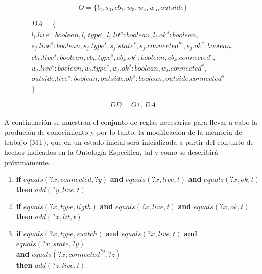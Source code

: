 \documentclass[10pt, a4paper,spanish]{article}
\begin{document}
			\begin{equation*}
				O = \{l_2, s_3, cb_1, w_3,w_4, w_5, outside\}
			\end{equation*}

			\begin{multline*}
				DA = \{ \\
					l_i.live^s:boolean, l_i.type^s, l_i.lit^s:boolean, l_i.ok^s:boolean, \\
					s_j.live^s:boolean, s_j.type^s, s_j.state^s, s_j.connected^m, s_j.ok^s:boolean, \\
					cb_k.live^s:boolean, cb_k.type^s, cb_k.ok^s:boolean, cb_k.connected^s, \\
					w_l.live^s:boolean, w_l.type^s, w_l.ok^s:boolean, w_l.connected^s, \\
					outside.live^s:boolean, outside.ok^s:boolean, outside.connected^s \\
				\}
			\end{multline*}

			\begin{equation*}
				DD = O \cup DA
			\end{equation*}

			\paragraph{}
			A continuación se muestran el conjunto de reglas necesarias para llevar a cabo la produción de conocimiento y por lo tanto, la modificación de la memoria de trabajo (MT), que en un estado inicial será inicializada a partir del conjunto de hechos indicados en la Ontología Especifica, tal y como se describirá próximamente.

			\begin{enumerate}
				\item
					\textbf{if} $equals(?x, connected, ?y)$ \textbf{and} $equals(?x, live, t)$ \textbf{and} $equals(?x, ok, t)$ \\
					\textbf{then} $add(?y, live, t)$

				\item
					\textbf{if} $equals(?x, type, ligth)$ \textbf{and} $equals(?x, live, t)$ \textbf{and} $equals(?x, ok, t)$ \\
					\textbf{then} $add(?x, lit, t)$

				\item
					\textbf{if} $equals(?x, type, switch)$ \textbf{and} $equals(?x, live, t)$ \textbf{and} $equals(?x, state, ?y)$ \\
					\hspace*{0.5cm} \textbf{and} $equals(?x, connected^{?y}, ?z)$ \\
					\textbf{then} $add(?z, live, t)$

			\end{enumerate}
			
\end{document}
